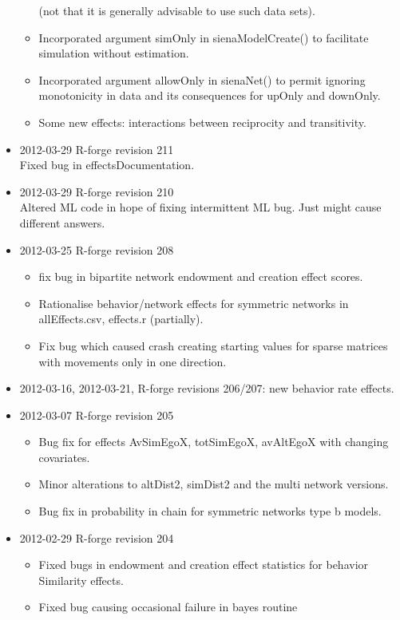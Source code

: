 \documentclass[a4paper,fleqn,11pt]{article}
\newcommand{\+}{\, + \,}
\begin{document}
\begin{small}
\begin{itemize}
\begin{itemize}
     (not that it is generally advisable to use such data sets).
     \item Incorporated argument simOnly in sienaModelCreate() to facilitate
	  simulation without estimation.
     \item Incorporated argument allowOnly in sienaNet() to permit
	  ignoring monotonicity in data and its consequences for upOnly and downOnly.
     \item Some new effects: interactions between reciprocity and
       transitivity.
    \end{itemize}
\item 2012-03-29 R-forge revision 211\\
Fixed bug in effectsDocumentation.
\item 2012-03-29 R-forge revision 210\\
Altered ML code in hope of fixing intermittent ML bug. Just might cause
different answers.
\item 2012-03-25 R-forge revision 208
\begin{itemize}
\item fix bug in bipartite network endowment
  and creation effect scores.
\item Rationalise behavior/network effects for symmetric
  networks in allEffects.csv, effects.r (partially).
\item Fix bug which caused crash creating starting values for sparse matrices
  with movements only in one direction.
\end{itemize}
\item 2012-03-16, 2012-03-21, R-forge revisions 206/207: new behavior rate
  effects.
\item 2012-03-07 R-forge revision 205
\begin{itemize}
\item Bug fix for effects AvSimEgoX, totSimEgoX, avAltEgoX with changing
  covariates.
\item Minor alterations to altDist2, simDist2 and the multi network
  versions.
\item Bug fix in probability in chain for symmetric networks type b models.
\end{itemize}
\item 2012-02-29 R-forge revision 204
\begin{itemize}
\item Fixed bugs in endowment and creation effect statistics for behavior
  Similarity effects.
\item Fixed bug causing occasional failure in bayes routine

\end{itemize}
\end{itemize}
\end{small}
\end{document}

